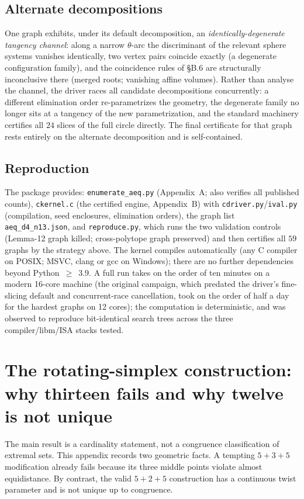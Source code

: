 \documentclass[11pt]{article}
\begin{document}
\subsection{Alternate decompositions}
One graph exhibits, under its default decomposition, an
\emph{identically-degenerate tangency channel}: along a narrow $\theta$-arc
the discriminant of the relevant sphere systems vanishes identically, two
vertex pairs coincide exactly (a degenerate configuration family), and the
coincidence rules of \S B.6 are structurally inconclusive there (merged roots;
vanishing affine volumes). Rather than analyse the channel, the driver races
all candidate decompositions concurrently: a different elimination order
re-parametrizes the geometry, the degenerate family no longer sits at a
tangency of the new parametrization, and the standard machinery certifies all
$24$ slices of the full circle directly. The final certificate for that graph
rests entirely on the alternate decomposition and is self-contained.

\subsection{Reproduction}
The package provides: \texttt{enumerate\_aeq.py} (Appendix~A; also verifies
all published counts), \texttt{ckernel.c} (the certified engine, Appendix~B)
with \texttt{cdriver.py}/\texttt{ival.py} (compilation, seed enclosures,
elimination orders), the graph list \texttt{aeq\_d4\_n13.json}, and
\texttt{reproduce.py}, which runs the two validation controls (Lemma-12 graph
killed; cross-polytope graph preserved) and then certifies all $59$ graphs by
the strategy above. The kernel compiles automatically (any C compiler on
POSIX; MSVC, clang or gcc on Windows); there are no further dependencies
beyond Python~$\ge$~3.9. A full run takes on the order of ten minutes on a
modern 16-core machine (the original campaign, which predated the driver's
fine-slicing default and concurrent-race cancellation, took on the order of
half a day for the hardest graphs on 12 cores); the computation is
deterministic, and was observed to reproduce bit-identical search trees
across the three compiler/libm/ISA stacks tested.

\section{The rotating-simplex construction: why thirteen fails and why
twelve is not unique}
\label{app:rotation}

The main result is a cardinality statement, not a congruence classification
of extremal sets.  This appendix records two geometric facts.  A tempting
$5+3+5$ modification already fails because its three middle points violate
almost equidistance.  By contrast, the valid $5+2+5$ construction has a
continuous twist parameter and is not unique up to congruence.
\end{document}
